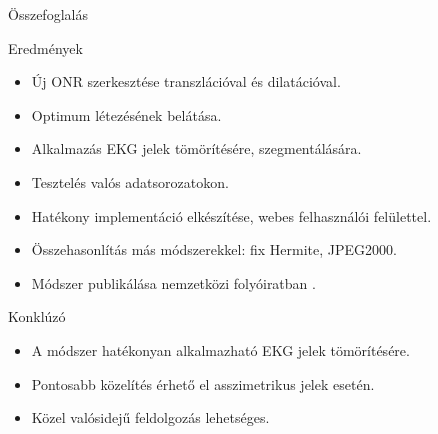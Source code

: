 \documentclass{beamer}
\begin{document}
\begin{frame}{Összefoglalás}
\linespread{0.8}
\small
\vspace{-2mm}
\begin{block}{Eredmények}
	\begin{itemize}
		\item Új ONR szerkesztése transzlációval és dilatációval.
		\item Optimum létezésének belátása.
		\item Alkalmazás EKG jelek tömörítésére, szegmentálására.
		\item Tesztelés valós adatsorozatokon.
		\item Hatékony implementáció elkészítése, webes felhasználói felülettel.
		\item Összehasonlítás más módszerekkel: fix Hermite, JPEG2000.
		\item Módszer publikálása nemzetközi folyóiratban \cite{sajat}.
	\end{itemize}
	\end{block}				
	\begin{block}{Konklúzó}
	\begin{itemize}
		\item A módszer hatékonyan alkalmazható EKG jelek tömörítésére.
		\item Pontosabb közelítés érhető el asszimetrikus jelek esetén.
		\item Közel valósidejű feldolgozás lehetséges.	
	\end{itemize}
	\end{block}	
\end{frame}
\end{document}
